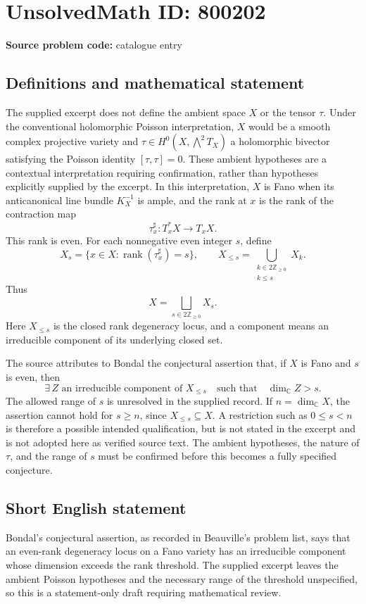 \documentclass[11pt]{article}
\newcommand{\Z}{\mathbb{Z}}
\newcommand{\C}{\mathbb{C}}
\begin{document}
\section*{UnsolvedMath ID: 800202}
\textbf{Source problem code:} catalogue entry
\subsection{Definitions and mathematical statement}
The supplied excerpt does not define the ambient space \(X\) or the tensor \(\tau\). Under the conventional holomorphic Poisson interpretation, \(X\) would be a smooth complex projective variety and \(\tau\in H^0(X,\bigwedge^2T_X)\) a holomorphic bivector satisfying the Poisson identity \([\tau,\tau]=0\). These ambient hypotheses are a contextual interpretation requiring confirmation, rather than hypotheses explicitly supplied by the excerpt. In this interpretation, \(X\) is Fano when its anticanonical line bundle \(K_X^{-1}\) is ample, and the rank at \(x\) is the rank of the contraction map
\[
\tau_x^{\sharp}:T_x^*X\longrightarrow T_xX.
\]
This rank is even. For each nonnegative even integer \(s\), define
\[
X_s=\{x\in X:\operatorname{rank}(\tau_x^{\sharp})=s\},
\qquad
X_{\leq s}=\bigcup_{\substack{k\in 2\Z_{\geq0}\\k\leq s}}X_k.
\]
Thus
\[
X=\bigsqcup_{s\in 2\Z_{\geq0}}X_s.
\]
Here \(X_{\leq s}\) is the closed rank degeneracy locus, and a component means an irreducible component of its underlying closed set.

The source attributes to Bondal the conjectural assertion that, if \(X\) is Fano and \(s\) is even, then
\[
\exists\, Z\text{ an irreducible component of }X_{\leq s}
\quad\text{such that}\quad
\dim_{\C}Z>s.
\]
The allowed range of \(s\) is unresolved in the supplied record. If \(n=\dim_{\C}X\), the assertion cannot hold for \(s\geq n\), since \(X_{\leq s}\subseteq X\). A restriction such as \(0\leq s<n\) is therefore a possible intended qualification, but is not stated in the excerpt and is not adopted here as verified source text. The ambient hypotheses, the nature of \(\tau\), and the range of \(s\) must be confirmed before this becomes a fully specified conjecture.
\subsection{Short English statement}
Bondal's conjectural assertion, as recorded in Beauville's problem list, says that an even-rank degeneracy locus on a Fano variety has an irreducible component whose dimension exceeds the rank threshold. The supplied excerpt leaves the ambient Poisson hypotheses and the necessary range of the threshold unspecified, so this is a statement-only draft requiring mathematical review.
\end{document}
